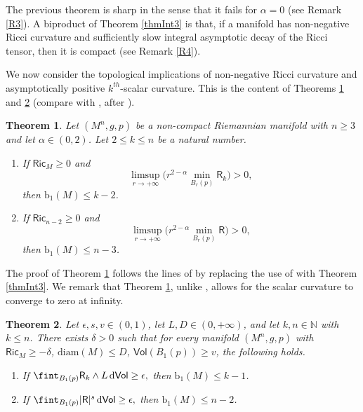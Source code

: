 \documentclass[10pt]{article}
\newtheorem{thm}{Theorem}[section]
\theoremstyle{definition}
\newcommand{\bb}[1]{\mathbb{#1}}
\newcommand{\ssf}[1]{\mathsf{#1}}
\newcommand{\Ric}{\mathsf{Ric}}
\newcommand{\R}{\mathsf{R}}
\newcommand{\de}{{\rm d}}
\begin{document}
    The previous theorem is sharp in the sense that it fails for $\alpha=0$ (see Remark \ref{R3}). A biproduct of Theorem \ref{thmInt3} is that, if a manifold has non-negative Ricci curvature and sufficiently slow integral asymptotic decay of the Ricci tensor, then it is compact (see Remark \ref{R4}).

We now consider the topological implications of non-negative Ricci curvature and asymptotically positive $k^{th}$-scalar curvature.
This is the content of Theorems \ref{thmIntFinal} and \ref{thmInt4} (compare with \cite[Theorems 1.3 and 1.7]{zhu2024twodimensionvanishingsplittingpositive}, after \cite{PanBlowDown}). 

\begin{thm} \label{thmIntFinal}
    Let $(M^n,g,p)$ be a non-compact Riemannian manifold with $n \geq 3$ and let $\alpha \in (0,2)$. Let $2 \leq k \leq n$ be a natural number.
    \begin{enumerate}
        \item 
        If $\Ric_M \geq 0$ and
    \begin{equation*} 
    \limsup_{r \to + \infty} \Big( r^{2-\alpha} \min_{B_r(p)} \R_k \Big) >0,
    \end{equation*}
    then $\mathrm{b}_1(M) \leq k-2$. 
    \item 
    If $\Ric_{n-2} \geq 0$ and
    \begin{equation*} 
    \limsup_{r \to + \infty} \Big( r^{2-\alpha} \min_{B_r(p)} \R \Big) >0,
    \end{equation*}
    then $\mathrm{b}_1(M) \leq n-3$.
    \end{enumerate}
    \end{thm}
    The proof of Theorem \ref{thmIntFinal} follows the lines of  \cite[Theorem 1.3]{zhu2024twodimensionvanishingsplittingpositive} by replacing the use of \cite[Theorem 1.6]{zhu2024twodimensionvanishingsplittingpositive} with Theorem \ref{thmInt3}.
    We remark that Theorem \ref{thmIntFinal}, unlike \cite[Theorem 1.3]{zhu2024twodimensionvanishingsplittingpositive}, allows for the scalar curvature to converge to zero at infinity.

\begin{thm} \label{thmInt4}
    Let $\epsilon,s,v \in (0,1)$, let $L,D \in (0,+\infty)$, and let $k,n \in \bb{N}$ with $k \leq n$. There exists $\delta>0$ such that for every manifold $(M^n,g,p)$ with
    $\Ric_{M} \geq -\delta$, $\mathrm{diam}(M) \leq D$, $\ssf{Vol}(B_1(p)) \geq v$, the following holds.
    \begin{enumerate}
    \item If
    $
     \fint_{B_1(p)} \R_{k} \wedge L \, \de \ssf{Vol} \geq \epsilon,
    $
    then $\mathrm{b}_1(M) \leq k-1$. 
        \item If
    $
     \fint_{B_1(p)} |\R|^s \, \de \ssf{Vol} \geq \epsilon,
    $
    then $\mathrm{b}_1(M) \leq n-2$. 
    \end{enumerate}
    \end{thm}
\end{document}
